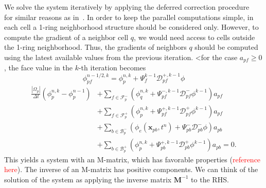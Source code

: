 \documentclass[../thesis.tex]{subfiles}
\begin{document}
We solve the system iteratively by applying the deferred correction procedure~\cite{2016_Moukalled_BOOK} for similar reasons as in~\cite{2019_Hahn}.
In order to keep the parallel computations simple, in each cell a 1-ring neighborhood structure should be considered only.
However, to compute the gradient of a neighbor cell \(q\), we would need access to cells outside the 1-ring neighborhood. Thus, the gradients of neighbors \( q \) should be computed using the latest available values from the previous iteration.
<for the case \(a_{pf} \geq 0\), the face value in the \(k\)-th iteration becomes
\begin{equation}
	\phi_{pf}^{n-1/2,k} = \phi_p^{n,k} + \Psi_{f}^{k-1} \mathcal{D}^{+,k-1}_{pf}\phi
\end{equation}
\begin{equation}
	\begin{split}
		\frac{|\Omega_p|}{\Delta t}(\phi^{n,k}_p - \phi_p^{n-1})
		&+ \sum_{f \in \mathcal{F}_p^-}
		\left(
			\phi_q^{n,k} +\Psi_{pf}^{-, k-1}\mathcal{D}^-_{pf}\phi^{k-1}
		\right) a_{pf}\\
		&+ \sum_{f \in \mathcal{F}_p^+}
		\left(
			\phi_p^{n,k} + \Psi_{pf}^{+, k-1}\mathcal{D}^+_{pf}\phi^{k-1}
		\right) a_{pf}\\
		&+ \sum_{b \in \mathcal{B}_p^-}
		\left(
			\phi_e(\boldsymbol{x}_{pb}, t^{n})
			+ \Psi_{pb}^-\mathcal{D}^-_{pb}\phi
		\right) a_{pb}\\
		&+ \sum_{b \in \mathcal{B}_p^+}
		\left(\phi_p^{n,k} +
		\Psi_{pb}^{+, k-1}\mathcal{D}^+_{pb}\phi^{k-1}\right) a_{pb} = 0.
	\end{split}
\end{equation}
This yields a system with an M-matrix, which has favorable properties (\textcolor{red}{reference here}). The inverse of an M-matrix has positive components. We can think of the solution of the system as applying the inverse matrix \(\mathbf{M}^{-1}\) to the RHS.
\end{document}
